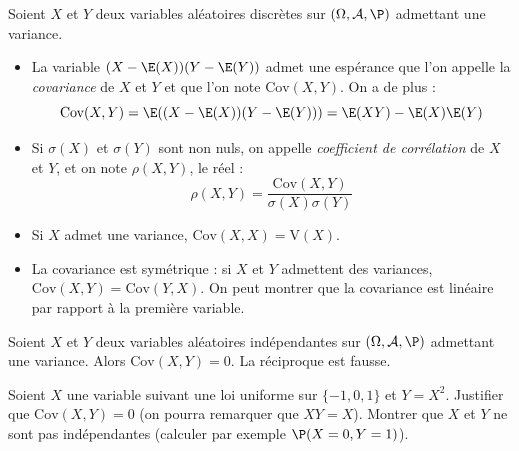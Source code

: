 \documentclass[french,11pt,twoside]{VcCours}
\begin{document}
\begin{Demonstration}{}
\vspace*{3cm}
\end{Demonstration}


\begin{TheoremeDefinition}{} 
Soient $X$ et $Y$ deux variables aléatoires discrètes sur $(\Omega, \mathcal{A}, \P)$ admettant une variance.
\begin{itemize}
\item La variable $(X-\E(X))(Y-\E(Y))$ admet une espérance que l'on appelle la \emph{covariance} de $X$ et $Y$ et que l'on note $\textrm{Cov}(X,Y)$. On a de plus :
$$ \textrm{Cov}(X,Y) = \E((X-\E(X))(Y-\E(Y))) = \E(XY) - \E(X)\E(Y)$$
\item Si $\sigma(X)$ et $\sigma(Y)$ sont non nuls, on appelle \emph{coefficient de corrélation} de $X$ et $Y$, et on note $\rho(X,Y)$, le réel :
$$ \rho(X,Y) = \dfrac{\textrm{Cov}(X,Y)}{\sigma(X) \sigma(Y)}$$
\end{itemize}
\end{TheoremeDefinition}{}

\begin{Demonstration}{}
\vspace*{6cm}
\end{Demonstration}

\begin{Remarques}{}
\begin{itemize}
\item Si $X$ admet une variance, $\textrm{Cov}(X,X)= \textrm{V}(X)$.
\item La covariance est symétrique : si $X$ et $Y$ admettent des variances, $\textrm{Cov}(X,Y) = \textrm{Cov}(Y,X)$. On peut montrer que la covariance est linéaire par rapport à la première variable.
\end{itemize}
\end{Remarques}

\begin{Proposition}{} Soient $X$ et $Y$ deux variables aléatoires indépendantes sur $(\Omega, \mathcal{A}, \P)$ admettant une variance. Alors $\textrm{Cov}(X,Y)=0$. La réciproque est fausse.
\end{Proposition}

\begin{Demonstration}{}

\vspace*{1cm}
\end{Demonstration}

\begin{ApplicationDirecte}{} Soient $X$ une variable suivant une loi uniforme sur $\lbrace -1,0,1 \rbrace$ et $Y=X^2$. Justifier que $\textrm{Cov}(X,Y)=0$ (on pourra remarquer que $XY=X$). Montrer que $X$ et $Y$ ne sont pas indépendantes (calculer par exemple $\P(X=0, Y=1)$).
\end{ApplicationDirecte}
\end{document}
